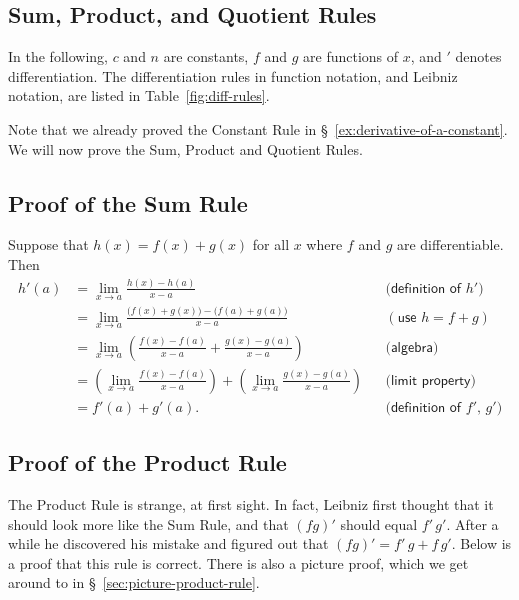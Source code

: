 \subsection{Sum, Product, and Quotient Rules} 
In the following, $c$ and
$n$ are constants, $f$ and $g$ are functions of $x$, and ${}'$ denotes
differentiation. The differentiation rules in function notation, and
Leibniz notation, are listed in Table~\ref{fig:diff-rules}.


Note that we already proved the Constant Rule in
\S~\ref{ex:derivative-of-a-constant}.  We will now prove the Sum,
Product and Quotient Rules.

\subsection{Proof of the Sum Rule} 
Suppose that $h(x)=f(x)+g(x)$ for
all $x$ where $f$ and $g$ are differentiable. Then
\begin{align*}
  h'(a)
  & =\lim_{x\to a}\frac{h(x)-h(a)}{x-a}
  &&\textsf{(definition of $h'$)} \\
  & =\lim_{x\to a}\frac{\bigl(f(x)+g(x)\bigr)-\bigl(f(a)+g(a)\bigr)}{x-a}
  &&(\textsf{use }h=f+g)\\
  & =\lim_{x\to a}\left(\frac{f(x)-f(a)}{x-a}+\frac{g(x)-g(a)}{x-a}\right)
  &&\textsf{(algebra)} \\
  & =\left(\lim_{x\to a}\frac{f(x)-f(a)}{x-a}\right)+\left(\lim_{x\to a}\frac{g(x)-g(a)}{x-a}\right)
  &&\textsf{(limit property)} \\[3pt]
  &=f'(a)+g'(a).
  &&\textsf{(definition of $f'$, $g'$)}
\end{align*}






\subsection{Proof of the Product Rule} 
The Product Rule is strange, at
first sight.  In fact, Leibniz first thought that it should look more
like the Sum Rule, and that $(fg)'$ should equal $f'\,g'$.  After
a while he discovered his mistake and figured out that $(fg)' =f'\,g+f\, g'$.  Below is a proof that this rule is correct.  There is
also a picture proof, which we get around to in
\S~\ref{sec:picture-product-rule}.

